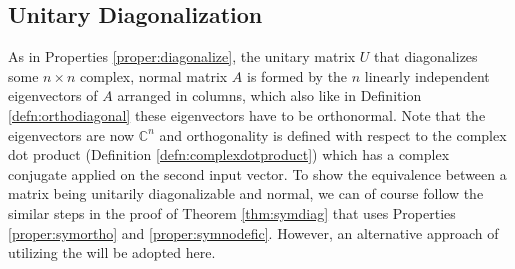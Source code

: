 \subsection{Unitary Diagonalization}

As in Properties \ref{proper:diagonalize}, the unitary matrix $U$ that diagonalizes some $n \times n$ complex, normal matrix $A$ is formed by the $n$ linearly independent eigenvectors of $A$ arranged in columns, which also like in Definition \ref{defn:orthodiagonal} these eigenvectors have to be orthonormal. Note that the eigenvectors are now $\mathbb{C}^n$ and orthogonality is defined with respect to the complex dot product (Definition \ref{defn:complexdotproduct}) which has a complex conjugate applied on the second input vector. To show the equivalence between a matrix being unitarily diagonalizable and normal, we can of course follow the similar steps in the proof of Theorem \ref{thm:symdiag} that uses Properties \ref{proper:symortho} and \ref{proper:symnodefic}. However, an alternative approach of utilizing the  will be adopted here.

